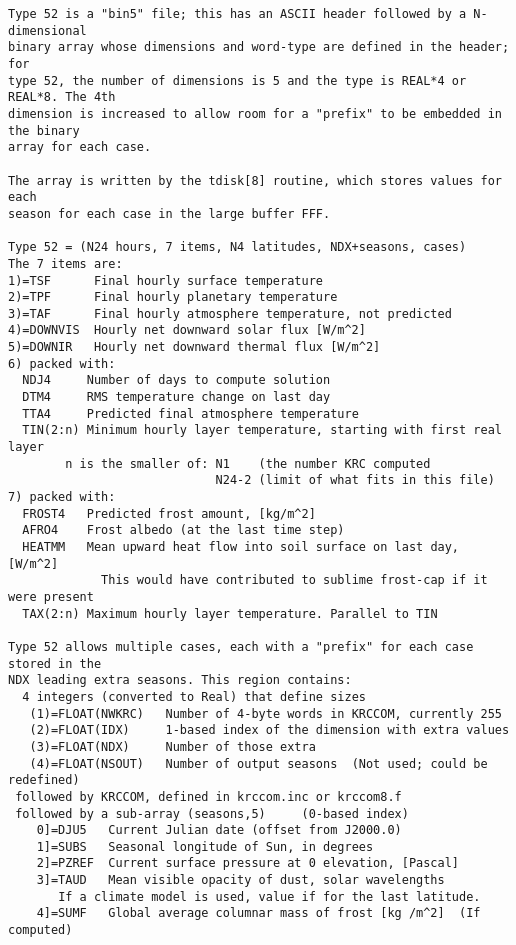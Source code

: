 \vspace{-3.mm} 
\begin{verbatim}
Type 52 is a "bin5" file; this has an ASCII header followed by a N-dimensional
binary array whose dimensions and word-type are defined in the header; for
type 52, the number of dimensions is 5 and the type is REAL*4 or REAL*8. The 4th
dimension is increased to allow room for a "prefix" to be embedded in the binary
array for each case.

The array is written by the tdisk[8] routine, which stores values for each 
season for each case in the large buffer FFF.   

Type 52 = (N24 hours, 7 items, N4 latitudes, NDX+seasons, cases)
The 7 items are:  
1)=TSF      Final hourly surface temperature
2)=TPF      Final hourly planetary temperature
3)=TAF      Final hourly atmosphere temperature, not predicted
4)=DOWNVIS  Hourly net downward solar flux [W/m^2]
5)=DOWNIR   Hourly net downward thermal flux [W/m^2]
6) packed with: 
  NDJ4     Number of days to compute solution
  DTM4     RMS temperature change on last day
  TTA4     Predicted final atmosphere temperature   
  TIN(2:n) Minimum hourly layer temperature, starting with first real layer
        n is the smaller of: N1    (the number KRC computed  
                             N24-2 (limit of what fits in this file)   
7) packed with: 
  FROST4   Predicted frost amount, [kg/m^2]
  AFRO4    Frost albedo (at the last time step)
  HEATMM   Mean upward heat flow into soil surface on last day, [W/m^2]
             This would have contributed to sublime frost-cap if it were present
  TAX(2:n) Maximum hourly layer temperature. Parallel to TIN

Type 52 allows multiple cases, each with a "prefix" for each case stored in the
NDX leading extra seasons. This region contains:
  4 integers (converted to Real) that define sizes
   (1)=FLOAT(NWKRC)   Number of 4-byte words in KRCCOM, currently 255
   (2)=FLOAT(IDX)     1-based index of the dimension with extra values
   (3)=FLOAT(NDX)     Number of those extra
   (4)=FLOAT(NSOUT)   Number of output seasons  (Not used; could be redefined)
 followed by KRCCOM, defined in krccom.inc or krccom8.f
 followed by a sub-array (seasons,5)     (0-based index)
    0]=DJU5   Current Julian date (offset from J2000.0)
    1]=SUBS   Seasonal longitude of Sun, in degrees
    2]=PZREF  Current surface pressure at 0 elevation, [Pascal] 
    3]=TAUD   Mean visible opacity of dust, solar wavelengths
       If a climate model is used, value if for the last latitude.
    4]=SUMF   Global average columnar mass of frost [kg /m^2]  (If computed)


\end{verbatim}
